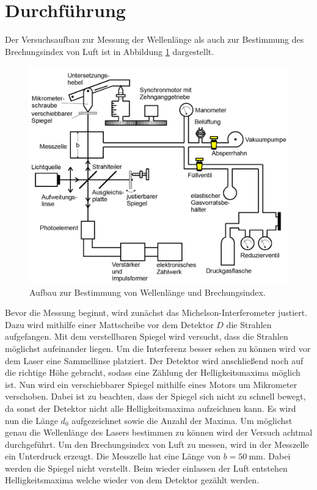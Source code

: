 \section{Durchführung}
Der Versuchsaufbau zur Messung der Wellenlänge als auch
zur Bestimmung des Brechungsindex von Luft ist in Abbildung \ref{abb:3}
dargestellt.
\begin{figure}[H]
  \centering
  \includegraphics[width=\textwidth]{content/Aufbau3.png}
  \caption{Aufbau zur Bestimmung von Wellenlänge und Brechungsindex.\cite{1}}
  \label{abb:3}
\end{figure}
Bevor die Messung beginnt, wird zunächst das Michelson-Interferometer justiert.
Dazu wird mithilfe einer Mattscheibe vor dem Detektor $D$ die Strahlen aufgefangen.
Mit dem verstellbaren Spiegel wird versucht, dass die Strahlen möglichst aufeinander liegen.
Um die Interferenz besser sehen zu können wird vor dem Laser eine Sammellinse platziert.
Der Detektor wird anschließend noch auf die richtige Höhe gebracht, sodass eine Zählung
der Helligkeitsmaxima möglich ist.
Nun wird ein verschiebbarer Spiegel mithilfe eines Motors um Mikrometer verschoben.
Dabei ist zu beachten, dass der Spiegel sich nicht zu schnell bewegt, da sonst der
Detektor nicht alle Helligkeitsmaxima aufzeichnen kann.
Es wird nun die Länge $d_0$ aufgezeichnet sowie die Anzahl der Maxima. Um möglichst
genau die Wellenlänge des Lasers bestimmen zu können wird der Versuch achtmal durchgeführt.
Um den Brechungsindex von Luft zu messen, wird in der Messzelle ein Unterdruck
erzeugt. Die Messzelle hat eine Länge von $b = \SI{50}{\milli\meter}$.
Dabei werden die Spiegel nicht verstellt. Beim wieder einlassen der Luft entstehen Helligkeitsmaxima
welche wieder von dem Detektor gezählt werden.
